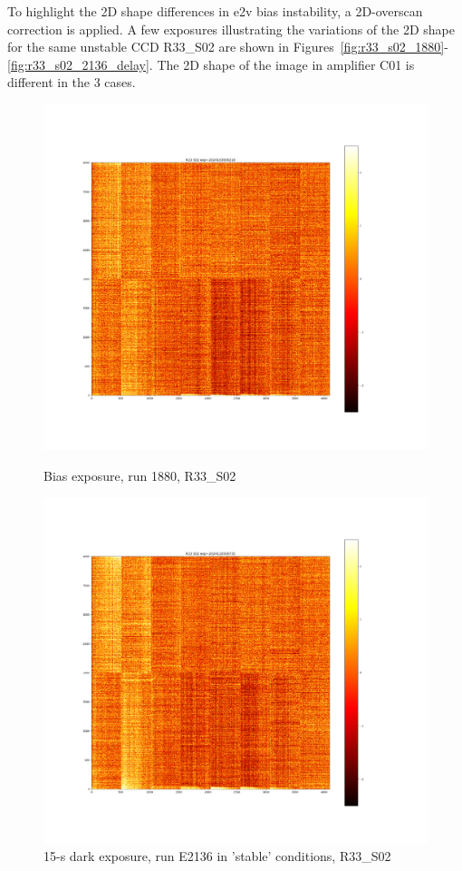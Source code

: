 To highlight the 2D shape differences in e2v bias instability, a 2D-overscan correction
is applied. A few exposures illustrating the variations of the 2D shape
for the same unstable CCD R33\_S02 are shown in Figures~\ref{fig:r33_s02_1880}-\ref{fig:r33_s02_2136_delay}. The 2D shape of the image in
amplifier C01 is different in the 3 cases.

\begin{figure}[htbp]
\centering
\begin{minipage}{0.45\textwidth}
    \centering
    \includegraphics[width=\textwidth]{figures/E1880_bias_R33_S02.png}
    \caption{Bias exposure, run 1880, R33\_S02}
    \label{fig:r33_s02_1880}
\end{minipage}
\hfill
\begin{minipage}{0.45\textwidth}
    \centering
    \includegraphics[width=\textwidth]{figures/E2136_dark15_R33_S02.png}
    \caption{15-s dark exposure, run E2136 in 'stable' conditions, R33\_S02}
    \label{fig:r33_s02_2136}
\end{minipage}


\end{figure}
